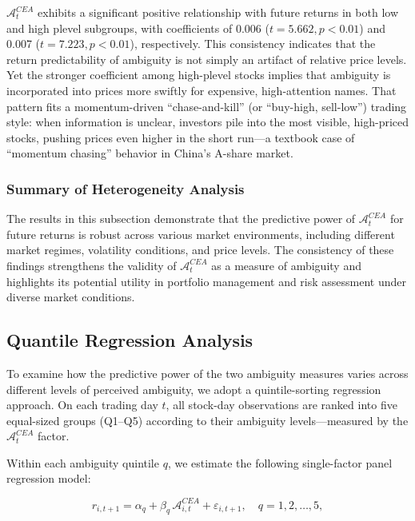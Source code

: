 \documentclass[preprint,12pt,authoryear]{elsarticle}
\begin{document}
$\mathcal{A}^{CEA}_t$ exhibits a significant positive relationship with future returns in both low and high plevel subgroups, with coefficients of 0.006 ($t = 5.662, p < 0.01$) and 0.007 ($t = 7.223, p < 0.01$), respectively. This consistency indicates that the return predictability of ambiguity is not simply an artifact of relative price levels. Yet the stronger coefficient among high-plevel stocks implies that ambiguity is incorporated into prices more swiftly for expensive, high-attention names. That pattern fits a momentum-driven ``chase-and-kill'' (or ``buy-high, sell-low'') trading style: when information is unclear, investors pile into the most visible, high-priced stocks, pushing prices even higher in the short run—a textbook case of ``momentum chasing'' behavior in China's A-share market.

\subsubsection{Summary of Heterogeneity Analysis}

The results in this subsection demonstrate that the predictive power of $\mathcal{A}^{CEA}_t$ for future returns is robust across various market environments, including different market regimes, volatility conditions, and price levels. The consistency of these findings strengthens the validity of $\mathcal{A}^{CEA}_t$ as a measure of ambiguity and highlights its potential utility in portfolio management and risk assessment under diverse market conditions.




\subsection{ Quantile Regression Analysis}

To examine how the predictive power of the two ambiguity measures varies across different levels of perceived ambiguity, we adopt a quintile-sorting regression approach. On each trading day \( t \), all stock-day observations are ranked into five equal-sized groups (Q1–Q5) according to their ambiguity levels—measured by the \(\mathcal{A}^{CEA}_t\) factor.

Within each ambiguity quintile \( q \), we estimate the following single-factor panel regression model:

\begin{equation}
r_{i,t+1} = \alpha_q + \beta_q\,\mathcal{A}^{CEA}_{i,t} + \varepsilon_{i,t+1},
\quad q = 1,2,\ldots,5,
\end{equation}
\end{document}
